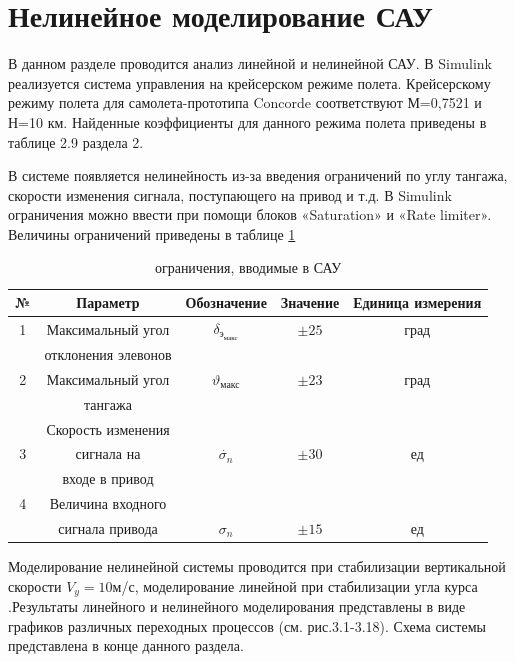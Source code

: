 \section{Нелинейное моделирование САУ}

В данном разделе проводится анализ линейной и нелинейной САУ. В Simulink реализуется система управления на крейсерском режиме полета. Крейсерскому режиму полета для самолета-прототипа Concorde соответствуют М=0,7521 и Н=10 км. Найденные коэффициенты для данного режима полета приведены в таблице 2.9 раздела 2. 

В системе появляется нелинейность из-за введения ограничений по углу тангажа, скорости изменения сигнала, поступающего на привод и т.д. В Simulink ограничения можно ввести при помощи блоков «Saturation» и «Rate limiter». Величины ограничений приведены в таблице \ref{tab:Нелинейности}

\begin{table}[H]
    \centering
    \caption{ограничения, вводимые в САУ}
    \begin{tabular}{|c|c|c|c|c|}
    \hline
        № & Параметр & Обозначение & Значение & Единица измерения \\ \hline
        1 & Максимальный угол & $\delta_\text{э}_\text{макс}$ & $\pm 25$ & град \\ 
         & отклонения элевонов &  &  & \\ \hline
        2 & Максимальный угол & $\vartheta_\text{макс}$ & $\pm 23$ & град\\
         & тангажа &  &  & \\ \hline
         & Скорость изменения &  &  & \\ 
        3 & сигнала на & $\dot{\sigma_n}$ & $\pm 30$ &ед \\ 
        & входе в привод &  &  & \\ \hline
        4 & Величина входного &  &  & \\ 
         & сигнала привода & $\sigma_n$ & $\pm 15$ &ед \\ \hline
    \end{tabular}
    \label{tab:Нелинейности}
\end{table}

Моделирование нелинейной системы проводится при стабилизации вертикальной скорости $V_y = 10$м/с, моделирование линейной при стабилизации угла курса  .Результаты линейного и нелинейного моделирования представлены в виде графиков различных переходных процессов (см. рис.3.1-3.18). Схема системы представлена в конце данного раздела.

